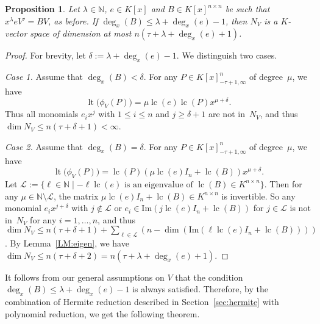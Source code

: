 \documentclass[final,1p,times,authoryear]{elsarticle}
\newtheorem{prop}[theorem]{Proposition}
\newcommand{\bN}{ {\mathbb N}}
\let\set\mathbb
\def\lc{\operatorname{lc}}
\def\lt{\operatorname{lt}}
\begin{document}
\begin{prop}\label{PROP:finite}
Let $\lambda\in\set N$, $e\in K[x]$ and $B\in K[x]^{n \times n}$ be such that $x^\lambda eV'=BV$, as before.
If $\deg_x(B) \leq \lambda+\deg_x(e)-1$, then $N_V$ is a $K$-vector space of dimension at most $n(\tau+\lambda + \deg_x(e)+1)$.
\end{prop}
\begin{proof}
For brevity, let $\delta:=\lambda+\deg_x(e)-1$. We distinguish two cases.

\smallskip
{\it Case 1.}
Assume that $\deg_x(B) < \delta$. For any $P\in K[x]_{-\tau+1,\infty}^n$ of degree~$\mu$, we have
\[
  \lt\bigl(\phi_V(P)\bigr) = \mu\lc(e)\lc(P)x^{\mu+\delta}.
\]
Thus all monomials $e_i x^j$ with $1\leq i\leq n$ and $j\geq \delta+1$ are not in~$N_V$,
and thus $\dim N_V\leq n(\tau+\delta+1)<\infty$.

\smallskip
{\it Case 2.}
Assume that $\deg_x(B)=\delta$. For any $P\in K[x]_{-\tau+1,\infty}^n$ of degree~$\mu$, we have
\[
  \lt\bigl(\phi_V(P)\bigr) = \lc(P)(\mu\lc(e)I_n + \lc(B))x^{\mu+\delta}.
\]
Let $\mathcal{L} := \{\ell\in \bN \mid \text{$-\ell \lc(e)$ is an eigenvalue of $\lc(B) \in K^{n\times n}$} \}$.
Then for any $\mu \in \bN\setminus  \mathcal{L}$, the matrix $\mu\lc(e)I_n + \lc(B)\in K^{n\times n}$ is invertible.
So any monomial $e_ix^{j+\delta}$ with $j\notin \mathcal{L}$ or $e_i \in \text{Im}(j\lc(e)I_n + \lc(B))$ for $j \in \mathcal{L}$ is not in~$N_V$ for any $i=1, \ldots, n$,
and thus $\dim N_V\leq n(\tau+\delta+1) + \sum_{\ell\in \mathcal{L}} (n-\dim(\text{Im}(\ell\lc(e)I_n + \lc(B))))$.
By Lemma~\ref{LM:eigen}, we have $\dim N_V\leq n(\tau+\delta+2) = n(\tau + \lambda +\deg_x(e) + 1) $.
\end{proof}

It follows from our general assumptions on $V$ that the
condition $\deg_x(B) \leq \lambda+\deg_x(e)-1$ is always satisfied.
Therefore, by the combination of Hermite reduction described in Section~\ref{sec:hermite}
with polynomial reduction, we get the following theorem.
\end{document}
